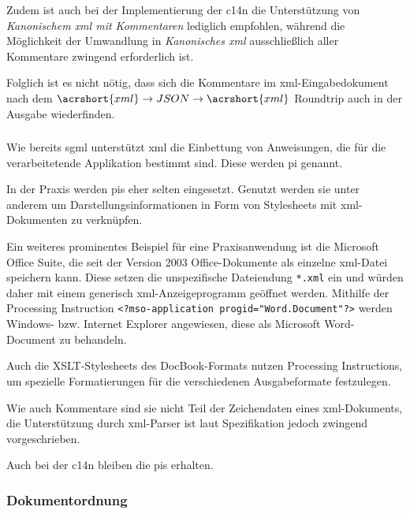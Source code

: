Zudem ist auch bei der Implementierung der \acrlong{c14n} die Unterstützung von \emph{Kanonischem \acrshort{xml} mit Kommentaren} lediglich empfohlen, während die Möglichkeit der Umwandlung in \emph{Kanonisches \acrshort{xml}} ausschließlich aller Kommentare zwingend erforderlich ist.~\cite[Abschnitt~2.1]{boyer2001c14n}

Folglich ist es nicht nötig, dass sich die Kommentare im \acrshort{xml}-Eingabedokument nach dem $\acrshort{xml}\rightarrow{}JSON\rightarrow{}\acrshort{xml}$ Roundtrip auch in der Ausgabe wiederfinden.

\subsubsection{}

Wie bereits \acrshort{sgml} unterstützt \acrshort{xml} die Einbettung von Anweisungen, die für die verarbeitetende Applikation bestimmt sind. Diese werden \acrfull{pi} genannt.

In der Praxis werden \glspl{pi} eher selten eingesetzt. Genutzt werden sie unter anderem um Darstellungsinformationen in Form von Stylesheets mit \acrshort{xml}-Dokumenten zu verknüpfen.~\cite[Abschnitt 4]{xmlstylesheet}

Ein weiteres prominentes Beispiel für eine Praxisanwendung ist die Microsoft Office Suite, die seit der Version 2003 Office-Dokumente als einzelne \acrshort{xml}-Datei speichern kann. Diese setzen die unspezifische Dateiendung \texttt{*.xml} ein und würden daher mit einem generisch \acrshort{xml}-Anzeigeprogramm geöffnet werden. Mithilfe der Processing Instruction \texttt{<?mso-application progid="Word.Document"?>} werden Windows- bzw. Internet Explorer angewiesen, diese als Microsoft Word-Document zu behandeln.~\cite[Abschnitt 3.2]{tverskov2008understandingpi}

Auch die XSLT-Stylesheets des DocBook-Formats nutzen Processing Instructions, um spezielle Formatierungen für die verschiedenen Ausgabeformate festzulegen.~\cite[{Kapitel \enquote{User Reference: PIs}}]{docbookxsl}

Wie auch Kommentare sind sie nicht Teil der Zeichendaten eines \acrshort{xml}-Dokuments, die Unterstützung durch \acrshort{xml}-Parser ist laut Spezifikation jedoch zwingend vorgeschrieben.

Auch bei der \acrlong{c14n} bleiben die \glspl{pi} erhalten.~\cite[Abschnitt 2.3]{boyer2001c14n}

\subsubsection{Dokumentordnung}

